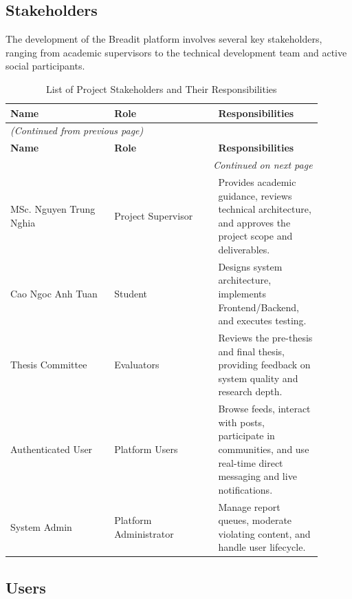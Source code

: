\subsection{Stakeholders}

The development of the Breadit platform involves several key stakeholders, ranging from academic supervisors to the technical development team and active social participants.

\begin{longtable}{|p{0.3\linewidth}|p{0.3\linewidth}|p{0.3\linewidth}|}
\caption{List of Project Stakeholders and Their Responsibilities} \label{tab:1} \\
\hline
\textbf{Name} & \textbf{Role} & \textbf{Responsibilities} \\
\hline
\endfirsthead
\multicolumn{3}{l}{\textit{(Continued from previous page)}} \\
\hline
\textbf{Name} & \textbf{Role} & \textbf{Responsibilities} \\
\hline
\endhead
\hline \multicolumn{3}{r}{\textit{Continued on next page}} \\
\endfoot
\hline
\endlastfoot
MSc. Nguyen Trung Nghia & Project Supervisor & Provides academic guidance, reviews technical architecture, and approves the project scope and deliverables. \\
\hline
Cao Ngoc Anh Tuan & Student & Designs system architecture, implements Frontend/Backend, and executes testing. \\
\hline
Thesis Committee & Evaluators & Reviews the pre-thesis and final thesis, providing feedback on system quality and research depth. \\
\hline
Authenticated User & Platform Users & Browse feeds, interact with posts, participate in communities, and use real-time direct messaging and live notifications. \\
\hline
System Admin & Platform Administrator & Manage report queues, moderate violating content, and handle user lifecycle. \\
\hline
\end{longtable}


\subsection{Users}

